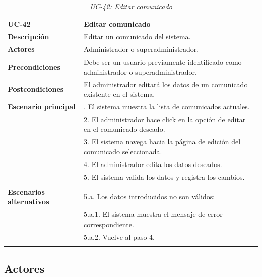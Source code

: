 \begin{table}
  \begin{center}
    \begin{tabularx}{16.4cm}{|l|X|}
      \hline
      \textbf{UC-42} & \textbf{Editar comunicado}\\
      \hline
      \textbf{Descripción} & Editar un comunicado del sistema.\\
      \hline
      \textbf{Actores} & Administrador o superadministrador.\\
      \hline
      \textbf{Precondiciones} & Debe ser un usuario previamente identificado como administrador o superadministrador.\\
      \hline
      \textbf{Postcondiciones} & El administrador editará los datos de un comunicado existente en el sistema.\\
      \hline
      \textbf{Escenario principal} & \smallskip 1. El sistema muestra la lista de comunicados actuales.\\
      & 2. El administrador hace click en la opción de editar en el comunicado deseado.\\
      & 3. El sistema navega hacia la página de edición del comunicado seleccionada.\\
      & 4. El administrador edita los datos deseados.\\
      & 5. El sistema valida los datos y registra los cambios.\\
      & \\
      \hline
      \textbf{Escenarios alternativos} & \smallskip 5.a. Los datos introducidos no son válidos:\\
      & \hspace{0.3cm} 5.a.1. El sistema muestra el mensaje de error correspondiente.\\
      & \hspace{0.3cm} 5.a.2. Vuelve al paso 4.\\
      & \\
      \hline
    \end{tabularx}
    \caption{\textit{UC-42: Editar comunicado}}
    \label{tab:CU-editar-comunicado}
  \end{center}
\end{table}



\subsection{Actores} 

